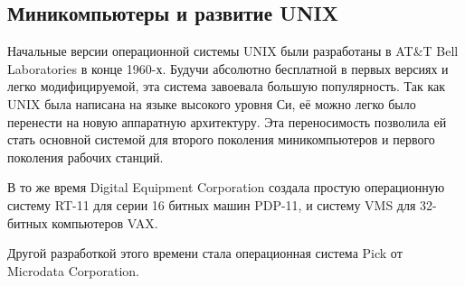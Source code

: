 \subsection{Миникомпьютеры и развитие UNIX}\label{base:os:history:unix}
Начальные версии операционной системы UNIX были разработаны в AT\&T Bell Laboratories в конце 1960-х. Будучи абсолютно бесплатной в первых версиях и легко модифицируемой, эта система завоевала большую популярность. Так как UNIX была написана на языке высокого уровня Си, её можно легко было перенести на новую аппаратную архитектуру. Эта переносимость позволила ей стать основной системой для второго поколения миникомпьютеров и первого поколения рабочих станций.

В то же время Digital Equipment Corporation создала простую операционную систему RT-11 для серии 16 битных машин PDP-11, и систему VMS для 32-битных компьютеров VAX.

Другой разработкой этого времени стала операционная система Pick от Microdata Corporation.